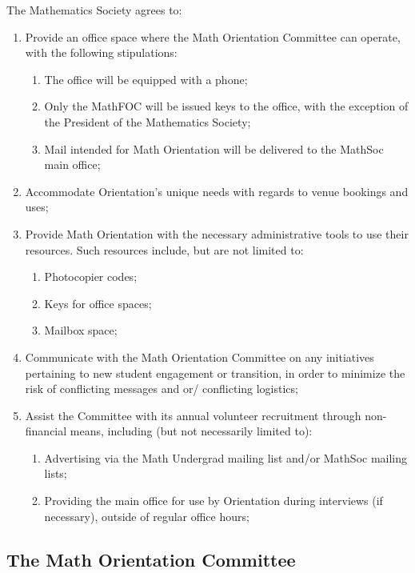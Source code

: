 \documentclass[12pt, letterpaper]{mathsoc}
\begin{document}
The Mathematics Society agrees to:
\begin{enumerate}
    \item Provide an office space where the Math Orientation Committee can operate, with the following stipulations:
    \begin{enumerate}
    \item The office will be equipped with a phone;
    \item Only the MathFOC will be issued keys to the office, with the exception of the President of the Mathematics Society;
    \item Mail intended for Math Orientation will be delivered to the MathSoc main office;
    \end{enumerate}
    \item Accommodate Orientation’s unique needs with regards to venue bookings and uses;
    \item Provide Math Orientation with the necessary administrative tools to use their resources. Such resources include, but are not limited to:
    \begin{enumerate}
    \item Photocopier codes;
    \item Keys for office spaces;
    \item Mailbox space;
    \end{enumerate}
    \item Communicate with the Math Orientation Committee on any initiatives pertaining to new student engagement or transition, in order to minimize the risk of conflicting messages and or/ conflicting logistics;
    \item Assist the Committee with its annual volunteer recruitment through non-financial means, including (but not necessarily limited to):
    \begin{enumerate}
    \item Advertising via the Math Undergrad mailing list and/or MathSoc mailing lists;
    \item Providing the main office for use by Orientation during interviews (if necessary), outside of regular office hours;
    \end{enumerate}
\end{enumerate}

\subsection{The Math Orientation Committee}
\end{document}
